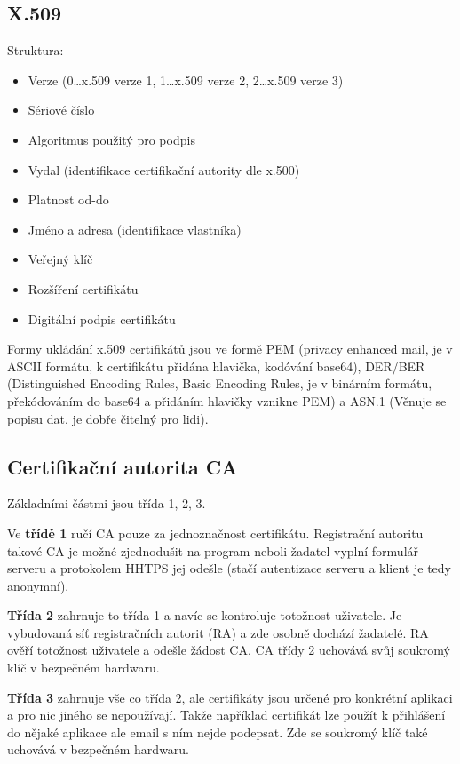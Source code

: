 \subsection{X.509}
Struktura:
\begin{itemize}[noitemsep]
    \item Verze (0\dots x.509 verze 1, 1\dots x.509 verze 2, 2\dots x.509 verze 3)
    \item Sériové číslo
    \item Algoritmus použitý pro podpis
    \item Vydal (identifikace certifikační autority dle x.500)
    \item Platnost od-do
    \item Jméno a adresa (identifikace vlastníka)
    \item Veřejný klíč
    \item Rozšíření certifikátu
    \item Digitální podpis certifikátu
\end{itemize}

Formy ukládání x.509 certifikátů jsou ve formě PEM (privacy enhanced mail, je v ASCII formátu, k certifikátu přidána hlavička, kodóvání base64), DER/BER (Distinguished Encoding Rules, Basic Encoding Rules, je v binárním formátu, překódováním do base64 a přidáním hlavičky vznikne PEM) a ASN.1 (Věnuje se popisu dat, je dobře čitelný pro lidi).

\subsection{Certifikační autorita CA}
Základními částmi jsou třída 1, 2, 3.

Ve \textbf{třídě 1} ručí CA pouze za jednoznačnost certifikátu. Registrační autoritu takové CA je možné zjednodušit na program neboli žadatel vyplní formulář serveru a protokolem HHTPS jej odešle (stačí autentizace serveru a klient je tedy anonymní).

\textbf{Třída 2} zahrnuje to třída 1 a navíc se kontroluje totožnost uživatele. Je vybudovaná síť registračních autorit (RA) a zde osobně dochází žadatelé. RA ověří totožnost uživatele a odešle žádost CA. CA třídy 2 uchovává svůj soukromý klíč v bezpečném hardwaru.

\textbf{Třída 3} zahrnuje vše co třída 2, ale certifikáty jsou určené pro konkrétní aplikaci a pro nic jiného se nepoužívají. Takže například certifikát lze použít k přihlášení do nějaké aplikace ale email s ním nejde podepsat. Zde se soukromý klíč také uchovává v bezpečném hardwaru.

